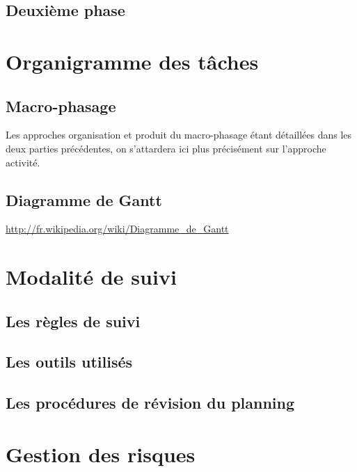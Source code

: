\documentclass[twoside]{article}
\begin{document}
\subsection{Deuxième phase}


\section{Organigramme des tâches}


\subsection{Macro-phasage}

Les approches organisation et produit du macro-phasage étant détaillées
dans les deux parties précédentes, on s'attardera ici plus précisément sur
l'approche activité.


\subsection{Diagramme de Gantt}

\url{http://fr.wikipedia.org/wiki/Diagramme\_de\_Gantt}


\section{Modalité de suivi}

\subsection{Les règles de suivi}
\subsection{Les outils utilisés}
\subsection{Les procédures de révision du planning}


\section{Gestion des risques}
\end{document}
